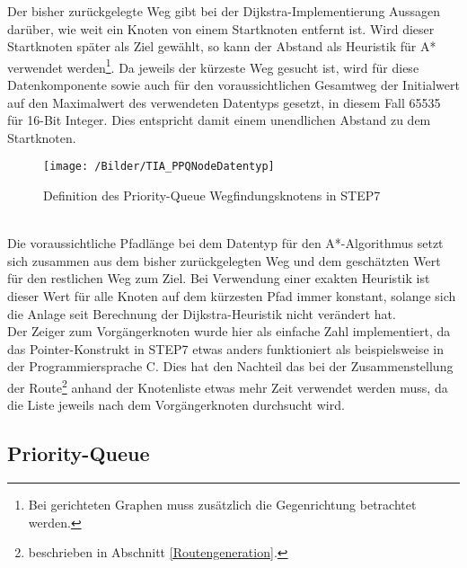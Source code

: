 			Der bisher zurückgelegte Weg gibt bei der Dijkstra-Implementierung Aussagen darüber, wie weit ein Knoten von einem Startknoten entfernt ist. Wird dieser Startknoten später als Ziel gewählt, so kann der Abstand als Heuristik für A* verwendet werden\footnote{Bei gerichteten Graphen muss zusätzlich die Gegenrichtung betrachtet werden.}. Da jeweils der kürzeste Weg gesucht ist, wird für diese Datenkomponente sowie auch für den voraussichtlichen Gesamtweg der Initialwert auf den Maximalwert des verwendeten Datentyps gesetzt, in diesem Fall 65535 für 16-Bit Integer. Dies entspricht damit einem unendlichen Abstand zu dem Startknoten.
			\\
			\begin{figure}[h]
				\centering
				\texttt{[image: /Bilder/TIA\_PPQNodeDatentyp]}
				\vspace{0.2cm}
				\caption{Definition des Priority-Queue Wegfindungsknotens in \ac{STEP7}}
			\end{figure}
			\\
			Die voraussichtliche Pfadlänge bei dem Datentyp für den A*-Algorithmus setzt sich zusammen aus dem bisher zurückgelegten Weg und dem geschätzten Wert für den restlichen Weg zum Ziel. Bei Verwendung einer exakten Heuristik ist dieser Wert für alle Knoten auf dem kürzesten Pfad immer konstant, solange sich die Anlage seit Berechnung der Dijkstra-Heuristik nicht verändert hat.
			\\[4pt]
			Der Zeiger zum Vorgängerknoten wurde hier als einfache Zahl implementiert, da das Pointer-Konstrukt in \ac{STEP7} etwas anders funktioniert als beispielsweise in der Programmiersprache C. Dies hat den Nachteil das bei der Zusammenstellung der Route\footnote{beschrieben in Abschnitt \ref{Routengeneration}.} anhand der Knotenliste etwas mehr Zeit verwendet werden muss, da die Liste jeweils nach dem Vorgängerknoten durchsucht wird.
		
		\subsection{Priority-Queue}
		
